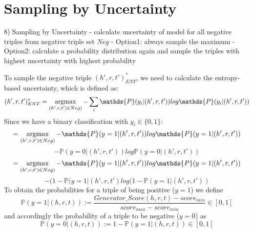 \section{Sampling by Uncertainty} 
\label{sec:sampling_by_uncertainty}

8) Sampling by Uncertainty
- calculate uncertainty of model for all negative triples from negative triple set $Neg$
- Option1: always sample the maximum
- Option2: calculate a probability distribution again and sample the triples with highest uncertainty with highest probability



To sample the negative triple $(h',r,t')^{*}_{ENT}$, we need to calculate the entropy-based uncertainty, which is defined as: 
$$(h',r,t')^{*}_{ENT} = \argmax_{(h',r,t') \in Neg)} -  \sum_{i}{\mathds{P}(y_i | (h',r,t')) log \mathds{P}(y_i|(h',r,t'))}$$
Since we have a binary classification with $y_i \in \{0,1\}$:\\
$$= \argmax_{(h',r,t') \in Neg)} - \mathds{P}(y = 1| (h',r,t')) log \mathds{P}(y = 1|(h',r,t'))$$
$$- \mathds{P}(y = 0| (h',r,t')) log \mathds{P}(y = 0|(h',r,t'))$$
$$= \argmax_{(h',r,t') \in Neg)} - \mathds{P}(y = 1| (h',r,t')) log \mathds{P}(y = 1|(h',r,t'))$$
$$- (1 - \mathds{P}(y = 1|(h',r,t') log(1 - \mathds{P}(y = 1|(h',r,t'))$$
To obtain the probabilities for a triple of being positive ($y=1$) we define
\begin{equation}
    \mathds{P}(y = 1|(h, r, t)) := \frac{Generator\_Score(h, r, t) - score_{min}}{score_{max} - score_{min}} \in [0, 1]
\end{equation}
and accordingly the probability of a triple to be negative ($y=0$) as
\begin{equation}
    \mathds{P}(y = 0|(h, r, t)) := 1 - \mathds{P}(y = 1|(h, r, t)) \in [0,1]
\end{equation}